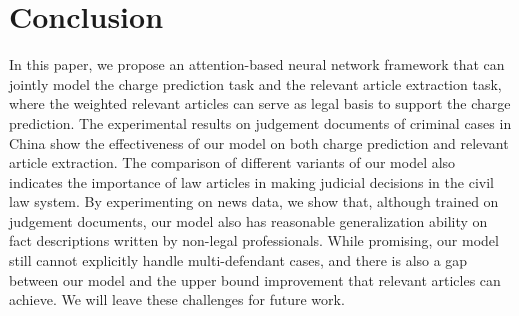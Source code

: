 \section{Conclusion}
In this paper, we propose an attention-based neural network framework that can jointly model the charge prediction task and the relevant article extraction task, where the weighted relevant articles can serve as legal basis to support the charge prediction.
The experimental results on judgement documents of criminal cases in China show the effectiveness of our model on both charge prediction and relevant article extraction.
The comparison of different variants of our model also indicates the importance of law articles in making judicial decisions in the civil law system.
By experimenting on news data, we show that, although trained on judgement documents, our model also has reasonable generalization ability on fact descriptions written by non-legal professionals.
While promising, our model still cannot explicitly handle multi-defendant cases, and there is also a gap between our model and the upper bound improvement that relevant articles can achieve. We will leave these challenges for future work.


